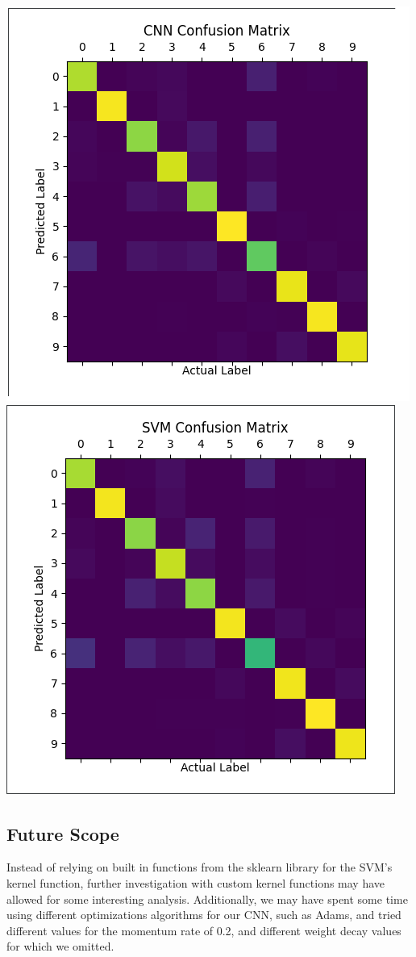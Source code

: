 \documentclass[12pt]{article}
\begin{document}
\includegraphics[scale=.5]{cnnconfusion.PNG}
\includegraphics[scale=.5]{svmconfusion.PNG}


\subsection{Future Scope}

Instead of relying on built in functions from the sklearn library for the SVM’s kernel function, further investigation with custom kernel functions may have allowed for some interesting analysis. Additionally, we may have spent some time using different optimizations algorithms for our CNN, such as Adams, and tried different values for the momentum rate of 0.2, and different weight decay values for which we omitted.

\printbibliography
\end{document}
